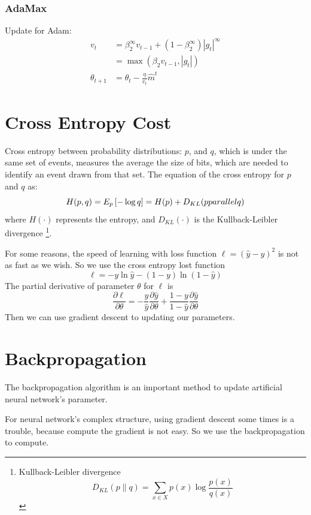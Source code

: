 \documentclass[twoside]{article}
\begin{document}
\subsubsection{AdaMax}
\label{sec:gd:gdoa:adamax}

Update for Adam:
\begin{align*}
v_t &=\beta^\infty_2v_{t-1}+(1-\beta_2^{\infty})|g_t|^\infty \\
	  &= \max(\beta_2v_{t-1},|g_t|) \\
\theta_{t+1} &= \theta_t - \frac{\eta}{v_t}\hat{m}^t
\end{align*}




\section{Cross Entropy Cost}
\label{sec:cec}

Cross entropy between probability distributions: $p$, and $q$, which is under the same set of events, measures the average
the size of bits, which are needed to identify an event drawn from that set.
The equation of the cross entropy for $p$ and $q$ as:
\[
H(p,q) = E_p\left[-\log{q}\right] = H(p) + D_{KL}(p\\parallel q)
\] 
where $H(\cdot)$ represents the entropy, and $D_{KL}(\cdot)$ is the Kullback-Leibler divergence%
\footnote{ Kullback-Leibler divergence
	\[
	D_{KL}(p\parallel q) = \sum\limits_{x \in X}p(x)\log\frac{p(x)}{q(x)}
	\]
}.

For some reasons, the speed of learning with loss function $\ell = (\hat{y}-y)^2$ is not as fast as we wish.
So we use the cross entropy lost function
\[
\ell = - y\ln{\hat{y}}-(1-y)\ln{(1-\hat{y})}
\]
The partial derivative of parameter $\theta$ for $\ell$ is 
\[
\frac{\partial \ell}{\partial \theta} = - \frac{y}{\hat{y}}\frac{\partial\hat{y}}{\partial\theta} + \frac{1-y}{1-\hat{y}}\frac{\partial\hat{y}}{\partial \theta}
\] 
Then we can use gradient descent to updating our parameters.


\section{Backpropagation}
\label{sec:bp}

The backpropagation algorithm is an important method to update artificial neural network's parameter. 

For neural network's complex structure, using gradient descent some times is a trouble, because
compute the gradient is not easy. So we use the backpropagation to compute.
\end{document}
